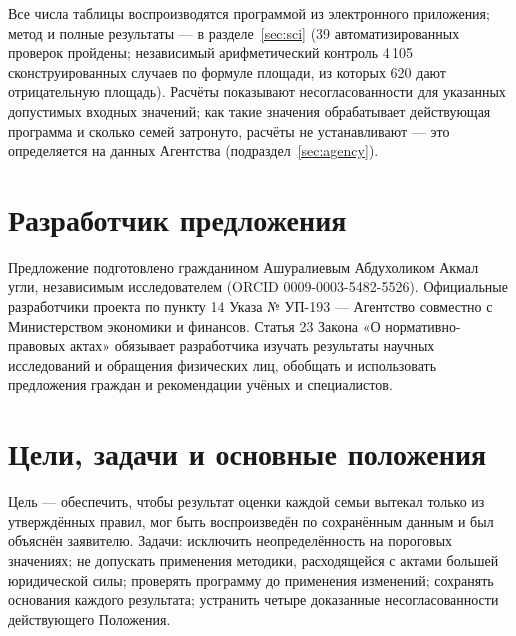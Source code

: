 \documentclass[14pt,a4paper]{extarticle}
\begin{document}
Все числа таблицы воспроизводятся программой из электронного приложения; метод и полные результаты — в разделе~\ref{sec:sci} (39 автоматизированных проверок пройдены; независимый арифметический контроль 4\,105 сконструированных случаев по формуле площади, из которых 620 дают отрицательную площадь). Расчёты показывают несогласованности для указанных допустимых входных значений; как такие значения обрабатывает действующая программа и сколько семей затронуто, расчёты не устанавливают — это определяется на данных Агентства (подраздел~\ref{sec:agency}).

\section{Разработчик предложения}
Предложение подготовлено гражданином Ашуралиевым Абдухоликом Акмал угли, независимым исследователем (ORCID 0009-0003-5482-5526). Официальные разработчики проекта по пункту 14 Указа № УП-193 — Агентство совместно с Министерством экономики и финансов. Статья 23 Закона «О нормативно-правовых актах» обязывает разработчика изучать результаты научных исследований и обращения физических лиц, обобщать и использовать предложения граждан и рекомендации учёных и специалистов\cite{orq682}.

\section{Цели, задачи и основные положения}
Цель — обеспечить, чтобы результат оценки каждой семьи вытекал только из утверждённых правил, мог быть воспроизведён по сохранённым данным и был объяснён заявителю. Задачи: исключить неопределённость на пороговых значениях; не допускать применения методики, расходящейся с актами большей юридической силы; проверять программу до применения изменений; сохранять основания каждого результата; устранить четыре доказанные несогласованности действующего Положения.
\end{document}
